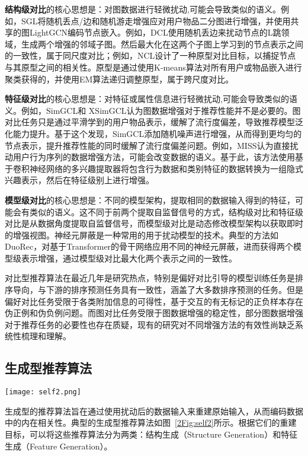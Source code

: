 \textbf{结构级对比}的核心思想是：对图数据进行轻微扰动,可能会导致类似的语义\cite{10.1145/3459637.3482426,10.1145/3477495.3532009,liu2021contrastive,wang2023sequential,xia2021self,xie2022contrastive,liu2021contrastive,10.1145/3404835.3462862}。例如，SGL\cite{10.1145/3404835.3462862}将随机丢点/边和随机游走增强应对用户物品二分图进行增强，并使用共享的图LightGCN\cite{Xiangnan:2020:SIGIR}编码节点嵌入。例如，DCL\cite{liu2021contrastive}使用随机丢边来扰动节点的L跳领域，生成两个增强的邻域子图。然后最大化在这两个子图上学习到的节点表示之间的一致性，属于同尺度对比；例如，NCL\cite{lin2022improving}设计了一种原型对比目标，以捕捉节点与其原型之间的相关性。原型是通过使用K-means算法对所有用户或物品嵌入进行聚类获得的，并使用EM算法递归调整原型，属于跨尺度对比。


\textbf{特征级对比}的核心思想是：对特征或属性信息进行轻微扰动,可能会导致类似的语义。例如，SimGCL\cite{yu2022graph}和 XSimGCL\cite{yu2023xsimgcl}认为图数据增强对于推荐性能并不是必要的。图对比任务只是通过平滑学到的用户物品表示，缓解了流行度偏差，导致推荐模型泛化能力提升。基于这个发现，SimGCL添加随机噪声进行增强，从而得到更均匀的节点表示，提升推荐性能的同时缓解了流行度偏差问题。例如，MISS\cite{guo2022miss}认为直接扰动用户行为序列的数据增强方法，可能会改变数据的语义。基于此，该方法使用基于卷积神经网络的多兴趣提取器将包含行为数据和类别特征的数据转换为一组隐式兴趣表示，然后在特征级别上进行增强。

\textbf{模型级对比}的核心思想是：不同的模型架构，提取相同的数据输入得到的特征，可能会有类似的语义。这不同于前两个提取自监督信号的方式，结构级对比和特征级对比是从数据角度提取自监督信号，而模型级对比是动态修改模型架构以获取即时的增强视图。神经元屏蔽是一种常用的用于扰动模型的技术。典型的方法如DuoRec\cite{qiu2022contrastive}，对基于Transformer的骨干网络应用不同的神经元屏蔽，进而获得两个模型级表示增强，通过模型级对比最大化两个表示之间的一致性。

对比型推荐算法在最近几年是研究热点，特别是偏好对比引导的模型训练任务是排序导向，与下游的排序预测任务具有一致性，涵盖了大多数排序预测的任务。但是偏好对比任务受限于各类附加信息的可得性，基于交互的有无标记的正负样本存在伪正例和伪负例问题。而图对比任务受限于图数据增强的稳定性，部分图数据增强对于推荐任务的必要性也存在质疑，现有的研究对不同增强方法的有效性尚缺乏系统性梳理和理解。

\subsection{生成型推荐算法}
\begin{figure*}[h!]
	\centering
	\texttt{[image: self2.png]}
	\caption{典型的生成型推荐算法示意图}
	\label{2Fig:self2}
\end{figure*}
生成型的推荐算法旨在通过使用扰动后的数据输入来重建原始输入，从而编码数据中的内在相关性。典型的生成型推荐算法如图~\ref{2Fig:self2}所示。根据它们的重建目标，可以将这些推荐算法分为两类：结构生成（Structure Generation）和特征生成（Feature Generation）。
